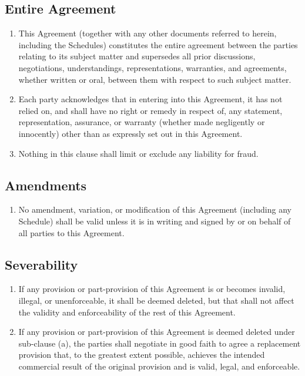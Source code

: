 \subsection{Entire Agreement}
\begin{enumerate}[label=(lph*)]
\item This Agreement (together with any other documents referred to herein, including the Schedules) constitutes the entire agreement between the parties relating to its subject matter and supersedes all prior discussions, negotiations, understandings, representations, warranties, and agreements, whether written or oral, between them with respect to such subject matter.
\item Each party acknowledges that in entering into this Agreement, it has not relied on, and shall have no right or remedy in respect of, any statement, representation, assurance, or warranty (whether made negligently or innocently) other than as expressly set out in this Agreement.
\item Nothing in this clause shall limit or exclude any liability for fraud.
\end{enumerate}

\subsection{Amendments}
\begin{enumerate}[label=(\alph*)]
\item No amendment, variation, or modification of this Agreement (including any Schedule) shall be valid unless it is in writing and signed by or on behalf of all parties to this Agreement.
\end{enumerate}

\subsection{Severability}
\begin{enumerate}[label=(\alph*)]
\item If any provision or part-provision of this Agreement is or becomes invalid, illegal, or unenforceable, it shall be deemed deleted, but that shall not affect the validity and enforceability of the rest of this Agreement.
\item If any provision or part-provision of this Agreement is deemed deleted under sub-clause (a), the parties shall negotiate in good faith to agree a replacement provision that, to the greatest extent possible, achieves the intended commercial result of the original provision and is valid, legal, and enforceable.
\end{enumerate}

